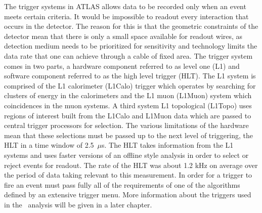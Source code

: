 The trigger systems in ATLAS allows data to be recorded only when an event meets
certain criteria. It would be impossible to readout every interaction that
occurs in the detector. The reason for this is that the geometric constraints of
the detector mean that there is only a small space available for readout wires,
as detection medium needs to be prioritized for sensitivity and technology
limits the data rate that one can achieve through a cable of fixed area. The
trigger system comes in two parts, a hardware component referred to as level one
(L1) and software component referred to as the high level trigger (HLT). The L1
system is comprised of the L1 calorimeter (L1Calo) trigger which operates by
searching for clusters of energy in the calorimeters and the L1 muon (L1Muon)
system which coincidences in the muon systems. A third system L1 topological
(L1Topo) uses regions of interest built from the L1Calo and L1Muon data which
are passed to central trigger processors for selection. The various limitations
of the hardware mean that these selections must be passed up to the next level
of triggering, the HLT in a time window of 2.5~$\mu$s. The HLT takes information
from the L1 systems and uses faster versions of an offline style analysis in
order to select or reject events for readout. The rate of the HLT was about 1.2
kHz on average over the period of data taking relevant to this measurement. In
order for a trigger to fire an event must pass fully all of the requirements of
one of the algorithms defined by an extensive trigger menu. More information
about the triggers used in the \VHbb\ analysis will be given in a later chapter.
